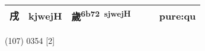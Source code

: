 \documentclass[14pt,a4paper]{scrartcl}
\begin{document}
\begin{longtable}[c]{@{}llllll@{}}
\begin{minipage}[t]{0.14\columnwidth}
戌
\strut\end{minipage} &
\begin{minipage}[t]{0.14\columnwidth}\raggedright\strut
kjwejH
\strut\end{minipage} &
\begin{minipage}[t]{0.14\columnwidth}\raggedright\strut
歲\textsuperscript{6b72~sjwejH}
\strut\end{minipage} &
\begin{minipage}[t]{0.14\columnwidth}\raggedright\strut
\strut\end{minipage} &
\begin{minipage}[t]{0.14\columnwidth}\raggedright\strut
\strut\end{minipage} &
\begin{minipage}[t]{0.14\columnwidth}\raggedright\strut
pure:qu
\strut\end{minipage}\tabularnewline
\bottomrule
\end{longtable}

(107) 0354 {[}2{]}
\end{document}
